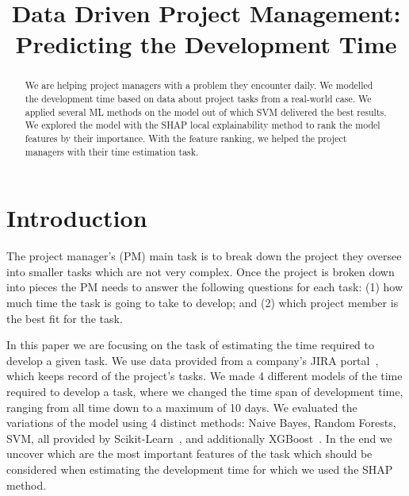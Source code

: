 \documentclass[conference,compsoc]{IEEEtran}
\begin{document}
\title{Data Driven Project Management: \\ Predicting the Development Time}


\author{
}

\maketitle

\begin{abstract}
We are helping project managers with a problem they encounter daily. We modelled the development time based on data about project tasks from a real-world case. We applied several ML methods on the model out of which SVM delivered the best results. We explored the model with the SHAP local explainability method to rank the model features by their importance. With the feature ranking, we helped the project managers with their time estimation task.
\end{abstract}

\section{Introduction}

The project manager's (PM) main task is to break down the project they oversee into smaller tasks which are not very complex. Once the project is broken down into pieces the PM needs to answer the following questions for each task: (1) how much time the task is going to take to develop; and (2) which project member is the best fit for the task.

In this paper we are focusing on the task of estimating the time required to develop a given task. We use data provided from a company's JIRA portal~\cite{JIRA}, which keeps record of the project's tasks. We made 4 different models of the time required to develop a task, where we changed the time span of development time, ranging from all time down to a maximum of 10 days. We evaluated the variations of the model using 4 distinct methods: Naive Bayes, Random Forests, SVM, all provided by Scikit-Learn~\cite{scikit-learn}, and additionally XGBoost~\cite{chen2016xgboost}. In the end we uncover which are the most important features of the task which should be considered when estimating the development time for which we used the SHAP~\cite{lundberg2020local2global} method.
\end{document}
